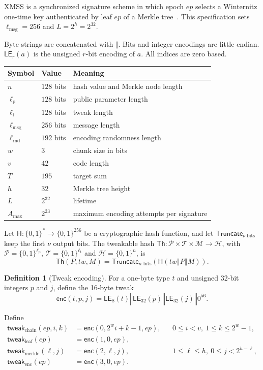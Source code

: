 \documentclass[11pt]{article}
\theoremstyle{definition}
\newtheorem{definition}{Definition}[section]
\theoremstyle{plain}
\theoremstyle{remark}
\newcommand{\bits}[1]{\{0,1\}^{#1}}
\newcommand{\Th}{\mathsf{Th}}
\newcommand{\hash}{\mathsf{H}}
\newcommand{\LE}{\mathsf{LE}}
\newcommand{\Truncate}{\mathsf{Truncate}}
\newcommand{\concat}{\mathbin\Vert}
\newcommand{\ep}{\mathit{ep}}
\newcommand{\tw}{\mathit{tw}}
\newcommand{\lmsg}{\ell_{\mathrm{msg}}}
\newcommand{\lpar}{\ell_{\mathrm{p}}}
\newcommand{\ltwk}{\ell_{\mathrm{t}}}
\newcommand{\lrnd}{\ell_{\mathrm{rnd}}}
\newcommand{\amax}{A_{\max}}
\begin{document}
XMSS is a synchronized signature scheme in which epoch $\ep$ selects a Winternitz one-time key authenticated by leaf $\ep$ of a Merkle tree~\cite{RFC8391}. This specification sets $\lmsg=256$ and $L=2^h=2^{32}$.

Byte strings are concatenated with $\concat$. Bits and integer encodings are little endian. $\LE_r(a)$ is the unsigned $r$-bit encoding of $a$. All indices are zero based.

\begin{center}
\begin{tabular}{@{}lll@{}}
\toprule
Symbol & Value & Meaning\\
\midrule
$n$ & $128$ bits & hash value and Merkle node length\\
$\lpar$ & $128$ bits & public parameter length\\
$\ltwk$ & $128$ bits & tweak length\\
$\lmsg$ & $256$ bits & message length\\
$\lrnd$ & $192$ bits & encoding randomness length\\
$w$ & $3$ & chunk size in bits\\
$v$ & $42$ & code length\\
$T$ & $195$ & target sum\\
$h$ & $32$ & Merkle tree height\\
$L$ & $2^{32}$ & lifetime\\
$\amax$ & $2^{23}$ & maximum encoding attempts per signature\\
\bottomrule
\end{tabular}
\end{center}

Let $\hash:\bits{*}\to\bits{256}$ be a cryptographic hash function, and let $\Truncate_{\nu\text{ bits}}$ keep the first $\nu$ output bits. The tweakable hash $\Th:\mathcal P\times\mathcal T\times\mathcal M\to\mathcal H$, with $\mathcal P=\bits{\lpar}$, $\mathcal T=\bits{\ltwk}$ and $\mathcal H=\bits{n}$, is
\[
  \Th(P,\tw,M)=\Truncate_{n\text{ bits}}\!\left(\hash(\tw\concat P\concat M)\right).
\]

\begin{definition}[Tweak encoding]
For a one-byte type $t$ and unsigned 32-bit integers $p$ and $j$, define the 16-byte tweak
\[
  \mathsf{enc}(t,p,j)=\LE_8(t)\concat\LE_{32}(p)\concat\LE_{32}(j)\concat 0^{56}.
\]
\end{definition}

Define
\[
\begin{aligned}
  \mathsf{tweak}_{\mathrm{chain}}(\ep,i,k) &= \mathsf{enc}(0,2^wi+k-1,\ep), &&0\leq i<v,\ 1\leq k\leq2^w-1,\\
  \mathsf{tweak}_{\mathrm{leaf}}(\ep) &= \mathsf{enc}(1,0,\ep),\\
  \mathsf{tweak}_{\mathrm{merkle}}(\ell,j) &= \mathsf{enc}(2,\ell,j), &&1\leq\ell\leq h,\ 0\leq j<2^{h-\ell},\\
  \mathsf{tweak}_{\mathrm{enc}}(\ep) &= \mathsf{enc}(3,0,\ep).
\end{aligned}
\]
\end{document}
